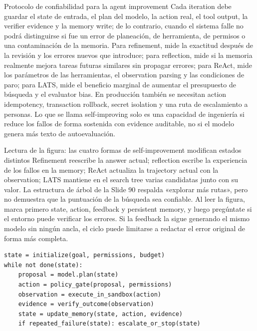 \documentclass[a4paper]{article}
\begin{document}
\begin{warningbox}{Protocolo de confiabilidad para la agent improvement}
Cada iteration debe guardar el state de entrada, el plan del modelo, la action real, el tool output, la verifier evidence y la memory write; de lo contrario, cuando el sistema falle no podrá distinguirse si fue un error de planeación, de herramienta, de permisos o una contaminación de la memoria. Para refinement, mide la exactitud después de la revisión y los errores nuevos que introduce; para reflection, mide si la memoria realmente mejora tareas futuras similares sin propagar errores; para ReAct, mide los parámetros de las herramientas, el observation parsing y las condiciones de paro; para LATS, mide el beneficio marginal de aumentar el presupuesto de búsqueda y el evaluator bias. En producción también se necesitan action idempotency, transaction rollback, secret isolation y una ruta de escalamiento a personas. Lo que se llama self-improving solo es una capacidad de ingeniería si reduce los fallos de forma sostenida con evidence auditable, no si el modelo genera más texto de autoevaluación.
\end{warningbox}

\begin{knowledgebox}{Lectura de la figura: las cuatro formas de self-improvement modifican estados distintos}
Refinement reescribe la answer actual; reflection escribe la experiencia de los fallos en la memory; ReAct actualiza la trajectory actual con la observation; LATS mantiene en el search tree varias candidatas junto con su valor. La estructura de árbol de la Slide 90 respalda «explorar más rutas», pero no demuestra que la puntuación de la búsqueda sea confiable. Al leer la figura, marca primero state, action, feedback y persistent memory, y luego pregúntate si el entorno puede verificar los errores. Si la feedback la sigue generando el mismo modelo sin ningún ancla, el ciclo puede limitarse a redactar el error original de forma más completa.
\end{knowledgebox}


\begin{lstlisting}[caption={Agent loop con verificación y límites de permisos}]
state = initialize(goal, permissions, budget)
while not done(state):
    proposal = model.plan(state)
    action = policy_gate(proposal, permissions)
    observation = execute_in_sandbox(action)
    evidence = verify_outcome(observation)
    state = update_memory(state, action, evidence)
    if repeated_failure(state): escalate_or_stop(state)
\end{lstlisting}
\end{document}
